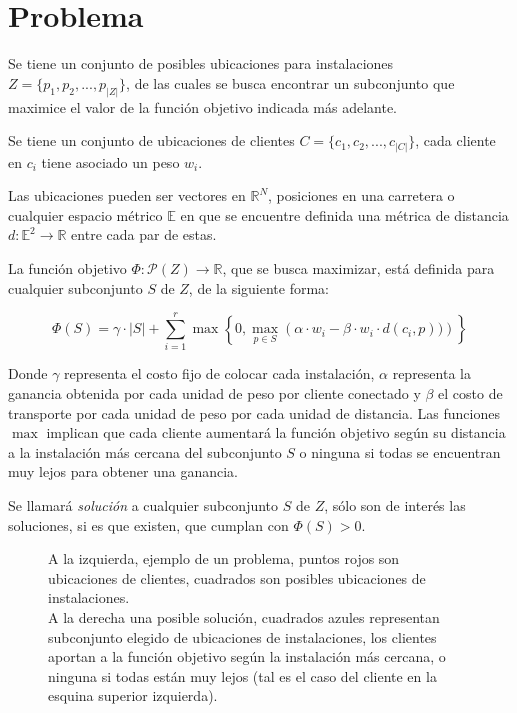 \section{Problema}



Se tiene un conjunto de posibles ubicaciones para instalaciones $Z = \{p_1,p_2,...,p_{|Z|}\}$, de las cuales se busca encontrar un subconjunto que maximice el valor de la función objetivo indicada más adelante.

Se tiene un conjunto de ubicaciones de clientes $C = \{c_1,c_2,...,c_{|C|}\}$, cada cliente en $c_i$ tiene asociado un peso $w_i$.

Las ubicaciones pueden ser vectores en $\mathbb{R}^N$, posiciones en una carretera o cualquier espacio métrico $\mathbb{E}$ en que se encuentre definida una métrica de distancia $d : \mathbb{E}^2 \rightarrow \mathbb{R}$ entre cada par de estas.

La función objetivo $\Phi : \mathcal{P}(Z) \rightarrow \mathbb{R}$, que se busca maximizar, está definida para cualquier subconjunto $S$ de $Z$, de la siguiente forma:

\begin{equation}
\Phi(S) = \gamma \cdot |S| + \sum_{i=1}^r \max \left\{0 , \max_{p \in S} \left(
    \alpha \cdot w_i - \beta \cdot w_i \cdot d(c_i,p))
\right) \right\}
\end{equation}

Donde $\gamma$ representa el costo fijo de colocar cada instalación, $\alpha$ representa la ganancia obtenida por cada unidad de peso por cliente conectado y $\beta$ el costo de transporte por cada unidad de peso por cada unidad de distancia. Las funciones $\max$ implican que cada cliente aumentará la función objetivo según su distancia a la instalación más cercana del subconjunto $S$ o ninguna si todas se encuentran muy lejos para obtener una ganancia.

Se llamará \emph{solución} a cualquier subconjunto $S$ de $Z$, sólo son de interés las soluciones, si es que existen, que cumplan con $\Phi(S) > 0$.

\begin{figure}%
    \centering
    \qquad \qquad \qquad
    \caption{A la izquierda, ejemplo de un problema, puntos rojos son ubicaciones de clientes, cuadrados son posibles ubicaciones de instalaciones.\\A la derecha una posible solución, cuadrados azules representan subconjunto elegido de ubicaciones de instalaciones, los clientes aportan a la función objetivo según la instalación más cercana, o ninguna si todas están muy lejos (tal es el caso del cliente en la esquina superior izquierda).}
    \label{fig:algorithm}
\end{figure}
